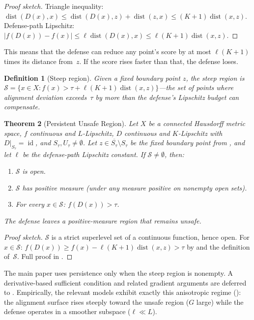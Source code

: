 \documentclass[11pt]{article}
\newtheorem{theorem}{Theorem}[section]
\newtheorem{definition}[theorem]{Definition}
\newcommand{\cl}[1]{\overline{#1}}
\newcommand{\id}{\operatorname{id}}
\newcommand{\dist}{\operatorname{dist}}
\begin{document}
\begin{proof}[Proof sketch]
Triangle inequality:
$\dist(D(x), x) \leq \dist(D(x), z) + \dist(z, x)
\leq (K+1)\dist(x, z)$.
Defense-path Lipschitz: $|f(D(x)) - f(x)| \leq \ell\dist(D(x), x)
\leq \ell(K+1)\dist(x, z)$.
\end{proof}

This means that the defense can reduce any point's score by at most
$\ell(K+1)$ times its distance from~$z$. If the score rises faster
than that, the defense loses.

\begin{definition}[Steep region]
\label{def:steep}
Given a fixed boundary point $z$, the \emph{steep region} is
$\mathcal{S} = \{x \in X : f(x) > \tau + \ell(K+1)\dist(x, z)\}$---the
set of points where alignment deviation exceeds~$\tau$ by more than
the defense's Lipschitz budget can compensate.
\end{definition}

\begin{theorem}[Persistent Unsafe Region]
\label{thm:persistent}
Let $X$ be a connected Hausdorff metric space, $f$ continuous and
$L$-Lipschitz, $D$ continuous and $K$-Lipschitz with
$D|_{S_\tau} = \id$, and $S_\tau, U_\tau \neq \emptyset$.
Let $z \in \cl{S_\tau} \setminus S_\tau$ be the fixed boundary
point from , and let $\ell$ be the defense-path
Lipschitz constant. If $\mathcal{S} \neq \emptyset$, then:
\begin{enumerate}[nosep]
  \item $\mathcal{S}$ is open.
  \item $\mathcal{S}$ has positive measure (under any measure positive
    on nonempty open sets).
  \item For every $x \in \mathcal{S}$: $f(D(x)) > \tau$.
\end{enumerate}
The defense leaves a positive-measure region that remains unsafe.
\end{theorem}

\begin{proof}[Proof sketch]
$\mathcal{S}$ is a strict superlevel set of a continuous function,
hence open. For $x \in \mathcal{S}$:
$f(D(x)) \geq f(x) - \ell(K+1)\dist(x,z) > \tau$
by  and the definition of~$\mathcal{S}$.
Full proof in .
\end{proof}

The main paper uses persistence only when the steep region is
nonempty. A derivative-based sufficient condition and related gradient
arguments are deferred to . Empirically,
the relevant models exhibit exactly this anisotropic regime
(): the alignment surface rises steeply toward
the unsafe region ($G$ large) while the defense operates in a smoother
subspace ($\ell \ll L$).
\end{document}
